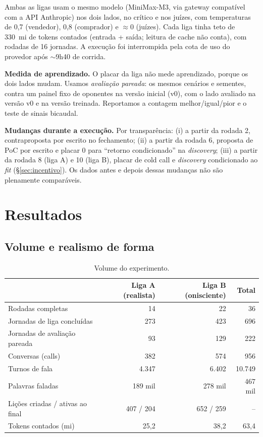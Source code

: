 \documentclass[11pt,a4paper]{article}
\begin{document}
Ambas as ligas usam o mesmo modelo (MiniMax-M3, via gateway compatível com a API Anthropic) nos dois lados, no crítico e nos juízes, com temperaturas de 0,7 (vendedor), 0,8 (comprador) e $\approx$0 (juízes). Cada liga tinha teto de 330~mi de tokens contados (entrada + saída; leitura de cache não conta), com rodadas de 16 jornadas. A execução foi interrompida pela cota de uso do provedor após $\sim$9h40 de corrida.

\textbf{Medida de aprendizado.} O placar da liga não mede aprendizado, porque os dois lados mudam. Usamos \emph{avaliação pareada}: os mesmos cenários e sementes, contra um painel fixo de oponentes na versão inicial (v0), com o lado avaliado na versão v0 e na versão treinada. Reportamos a contagem melhor/igual/pior e o teste de sinais bicaudal.

\textbf{Mudanças durante a execução.} Por transparência: (i) a partir da rodada 2, contraproposta por escrito no fechamento; (ii) a partir da rodada 6, proposta de PoC por escrito e placar 0 para ``retorno condicionado'' na \emph{discovery}; (iii) a partir da rodada 8 (liga A) e 10 (liga B), placar de cold call e \emph{discovery} condicionado ao \emph{fit} (\S\ref{sec:incentivo}). Os dados antes e depois dessas mudanças não são plenamente comparáveis.

\section{Resultados}

\subsection{Volume e realismo de forma}

\begin{table}[h]
\centering
\caption{Volume do experimento.}
\label{tab:volume}
\begin{tabular}{lrrr}
\toprule
 & Liga A (realista) & Liga B (onisciente) & Total \\
\midrule
Rodadas completas & 14 & 22 & 36 \\
Jornadas de liga concluídas & 273 & 423 & 696 \\
Jornadas de avaliação pareada & 93 & 129 & 222 \\
Conversas (calls) & 382 & 574 & 956 \\
Turnos de fala & 4.347 & 6.402 & 10.749 \\
Palavras faladas & 189 mil & 278 mil & 467 mil \\
Lições criadas / ativas ao final & 407 / 204 & 652 / 259 & -- \\
Tokens contados (mi) & 25,2 & 38,2 & 63,4 \\
\bottomrule
\end{tabular}
\end{table}
\end{document}

